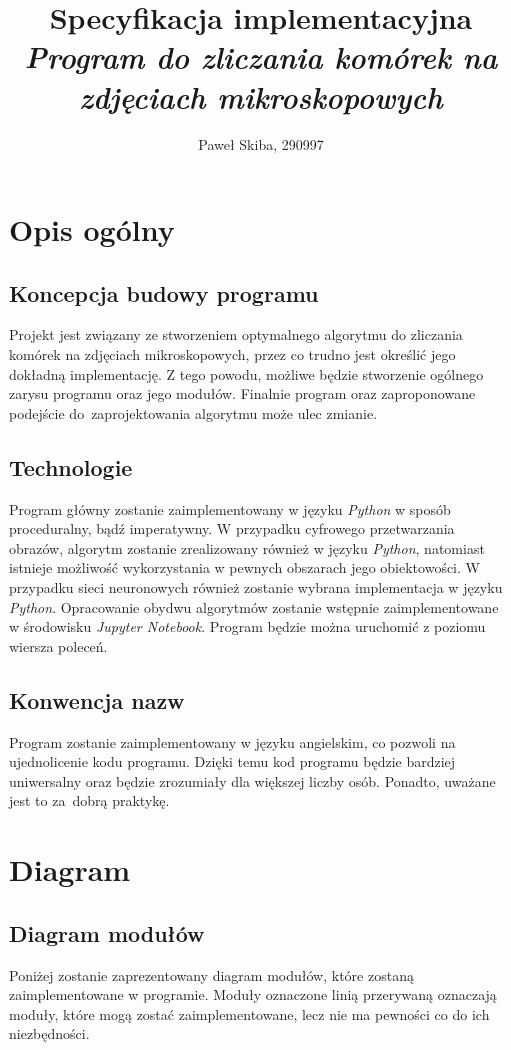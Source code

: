 \documentclass[a4paper]{article}
\title{\textbf{Specyfikacja implementacyjna} \\ \textit{Program do zliczania komórek na zdjęciach mikroskopowych}}
\author{Paweł Skiba, 290997}
\begin{document}
\maketitle
\thispagestyle{empty}
\tableofcontents

\newpage
\section{Opis ogólny}
\subsection{Koncepcja budowy programu}
Projekt jest związany ze stworzeniem optymalnego algorytmu do zliczania komórek na zdjęciach mikroskopowych, przez co trudno jest określić jego dokładną implementację. Z tego powodu, możliwe będzie stworzenie ogólnego zarysu programu oraz jego modułów. Finalnie program oraz zaproponowane podejście do~zaprojektowania algorytmu może ulec zmianie. 
\subsection{Technologie}
Program główny zostanie zaimplementowany w języku \textit{Python} w sposób proceduralny, bądź imperatywny. W przypadku cyfrowego przetwarzania obrazów, algorytm zostanie zrealizowany również w języku \textit{Python}, natomiast istnieje możliwość wykorzystania w pewnych obszarach jego obiektowości. W przypadku sieci neuronowych również zostanie wybrana implementacja w języku \textit{Python}. Opracowanie obydwu algorytmów zostanie wstępnie zaimplementowane w środowisku \textit{Jupyter Notebook}. Program będzie można uruchomić z poziomu wiersza poleceń.
\subsection{Konwencja nazw}
Program zostanie zaimplementowany w języku angielskim, co pozwoli na ujednolicenie kodu programu. Dzięki temu kod programu będzie bardziej uniwersalny oraz będzie zrozumiały dla większej liczby osób. Ponadto, uważane jest to za~dobrą praktykę.
\newpage
\section{Diagram}
\subsection{Diagram modułów}
Poniżej zostanie zaprezentowany diagram modułów, które zostaną zaimplementowane w programie. Moduły oznaczone linią przerywaną oznaczają moduły, które mogą zostać zaimplementowane, lecz nie ma pewności co do ich niezbędności.
\end{document}
